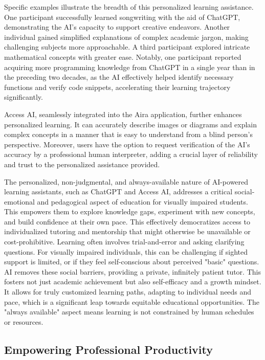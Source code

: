 Specific examples illustrate the breadth of this personalized learning assistance. One participant successfully learned songwriting with the aid of ChatGPT, demonstrating the AI's capacity to support creative endeavors. Another individual gained simplified explanations of complex academic jargon, making challenging subjects more approachable. A third participant explored intricate mathematical concepts with greater ease. Notably, one participant reported acquiring more programming knowledge from ChatGPT in a single year than in the preceding two decades, as the AI effectively helped identify necessary functions and verify code snippets, accelerating their learning trajectory significantly. \cite{maitraye2024}

Access AI, seamlessly integrated into the Aira application, further enhances personalized learning. It can accurately describe images or diagrams and explain complex concepts in a manner that is easy to understand from a blind person's perspective. Moreover, users have the option to request verification of the AI's accuracy by a professional human interpreter, adding a crucial layer of reliability and trust to the personalized assistance provided. \cite{victastudents2024}

The personalized, non-judgmental, and always-available nature of AI-powered learning assistants, such as ChatGPT and Access AI, addresses a critical social-emotional and pedagogical aspect of education for visually impaired students. This empowers them to explore knowledge gaps, experiment with new concepts, and build confidence at their own pace. This effectively democratizes access to individualized tutoring and mentorship that might otherwise be unavailable or cost-prohibitive. Learning often involves trial-and-error and asking clarifying questions. For visually impaired individuals, this can be challenging if sighted support is limited, or if they feel self-conscious about perceived "basic" questions. AI removes these social barriers, providing a private, infinitely patient tutor. This fosters not just academic achievement but also self-efficacy and a growth mindset. It allows for truly customized learning paths, adapting to individual needs and pace, which is a significant leap towards equitable educational opportunities. The "always available" aspect \cite{accessiblepharmacy2024} means learning is not constrained by human schedules or resources.

\subsection{Empowering Professional Productivity}

